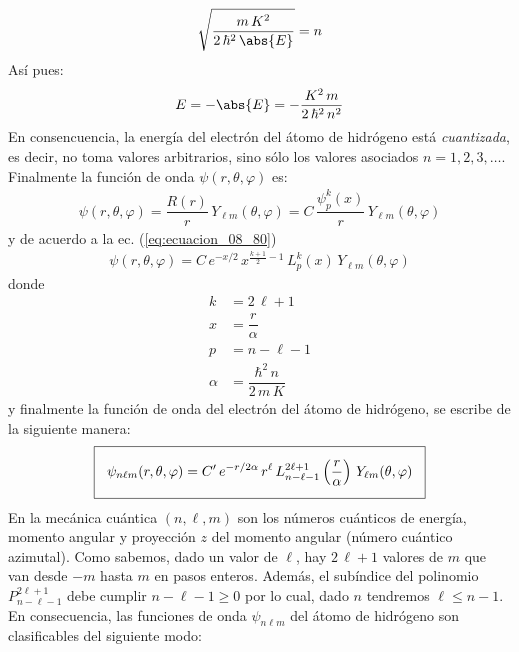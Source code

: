 \begin{align*}
\sqrt{\dfrac{m \, K^{2}}{2 \, \hbar^{2} \, \abs{E}}} = n
\end{align*}
Así pues:
\begin{align*}
E = - \abs{E} = - \dfrac{K^{2} \, m}{2 \, \hbar^{2} \, n^{2}}
\end{align*}
En consencuencia, la energía del electrón del átomo de hidrógeno está \emph{cuantizada}, es decir, no toma valores arbitrarios, sino sólo los valores asociados $n = 1, 2, 3, \ldots$. Finalmente la función de onda $\psi (r, \theta, \varphi)$ es:
\begin{align*}
\psi (r, \theta, \varphi) =  \dfrac{R(r)}{r} \, Y_{\ell m} (\theta, \varphi) = C \, \dfrac{\psi_{p}^{k} (x)}{r} \, Y_{\ell m} (\theta, \varphi)
\end{align*}
y de acuerdo a la ec. (\ref{eq:ecuacion_08_80})
\begin{align*}
\psi (r, \theta, \varphi) = C \, e^{-x/2} \, x^{\frac{k+1}{2} - 1} \, L_{p}^{k} (x) \, Y_{\ell m} (\theta, \varphi)
\end{align*}
donde
\begin{align*}
k &= 2 \, \ell + 1 \\
x &= \dfrac{r}{\alpha} \\
p &= n - \ell - 1 \\
\alpha &= \dfrac{\hbar^{2} \, n}{2 \, m \, K} 
\end{align*}
y finalmente la función de onda del electrón del átomo de hidrógeno, se escribe de la siguiente manera:
\begin{align*}
\setlength{\fboxsep}{3\fboxsep}\boxed{\psi_{n \ell m} (r, \theta, \varphi) = C^{\prime} \, e^{-r/2 \alpha} \, r^{\ell} \, L_{n -\ell-1}^{2 \ell+1} \left( \dfrac{r}{\alpha} \right) \, Y_{\ell m} (\theta, \varphi)}
\end{align*}
En la mecánica cuántica $(n, \ell, m)$ son los números cuánticos de energía, momento angular y proyección $z$ del momento angular (número cuántico azimutal). Como sabemos, dado un valor de $\ell$, hay $2 \, \ell + 1$ valores de $m$ que van desde $-m$ hasta $m$ en pasos enteros. Además, el subíndice del polinomio $P_{n-\ell-1}^{2 \ell+1}$ debe cumplir $n - \ell - 1 \geq 0$ por lo cual, dado $n$ tendremos $\ell \leq n - 1$. En consecuencia, las funciones de onda $\psi_{n \ell m}$ del átomo de hidrógeno son clasificables del siguiente modo:
